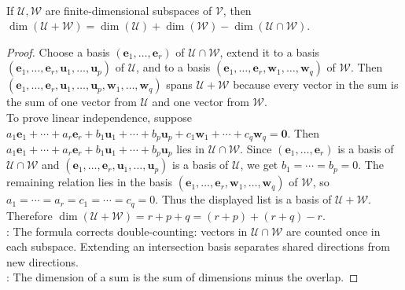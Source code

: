 \begin{theorem} \label{thm:dimension-formula-for-sum} \\
If $\mathcal{U}, \mathcal{W}$ are finite-dimensional subspaces of $\mathcal{V}$, then $\dim(\mathcal{U} + \mathcal{W}) = \dim(\mathcal{U}) + \dim(\mathcal{W}) - \dim(\mathcal{U} \cap \mathcal{W})$.
\begin{proof}
Choose a basis $(\mathbf{e}_1, \ldots, \mathbf{e}_r)$ of $\mathcal{U} \cap \mathcal{W}$, extend it to a basis $(\mathbf{e}_1, \ldots, \mathbf{e}_r, \mathbf{u}_1, \ldots, \mathbf{u}_p)$ of $\mathcal{U}$, and to a basis $(\mathbf{e}_1, \ldots, \mathbf{e}_r, \mathbf{w}_1, \ldots, \mathbf{w}_q)$ of $\mathcal{W}$. Then $(\mathbf{e}_1, \ldots, \mathbf{e}_r, \mathbf{u}_1, \ldots, \mathbf{u}_p, \mathbf{w}_1, \ldots, \mathbf{w}_q) $ spans $\mathcal{U}+\mathcal{W}$ because every vector in the sum is the sum of one vector from $\mathcal{U}$ and one vector from $\mathcal{W}$.\\
To prove linear independence, suppose $a_1\mathbf{e}_1+\cdots+a_r\mathbf{e}_r+b_1\mathbf{u}_1+\cdots+b_p\mathbf{u}_p+c_1\mathbf{w}_1+\cdots+c_q\mathbf{w}_q=\mathbf{0}$.
Then $a_1\mathbf{e}_1+\cdots+a_r\mathbf{e}_r+b_1\mathbf{u}_1+\cdots+b_p\mathbf{u}_p$ lies in $\mathcal{U}\cap\mathcal{W}$. Since $(\mathbf{e}_1,\ldots,\mathbf{e}_r)$ is a basis of $\mathcal{U}\cap\mathcal{W}$ and $(\mathbf{e}_1,\ldots,\mathbf{e}_r,\mathbf{u}_1,\ldots,\mathbf{u}_p)$ is a basis of $\mathcal{U}$, we get $b_1=\cdots=b_p=0$. The remaining relation lies in the basis $(\mathbf{e}_1,\ldots,\mathbf{e}_r,\mathbf{w}_1,\ldots,\mathbf{w}_q)$ of $\mathcal{W}$, so $a_1=\cdots=a_r=c_1=\cdots=c_q=0$. Thus the displayed list is a basis of $\mathcal{U}+\mathcal{W}$.\\
Therefore $\dim(\mathcal{U} + \mathcal{W}) = r + p + q = (r+p) + (r+q) - r$.\\
: The formula corrects double-counting: vectors in $\mathcal{U} \cap \mathcal{W}$ are counted once in each subspace. Extending an intersection basis separates shared directions from new directions.\\
: The dimension of a sum is the sum of dimensions minus the overlap.
\end{proof}
\end{theorem}

